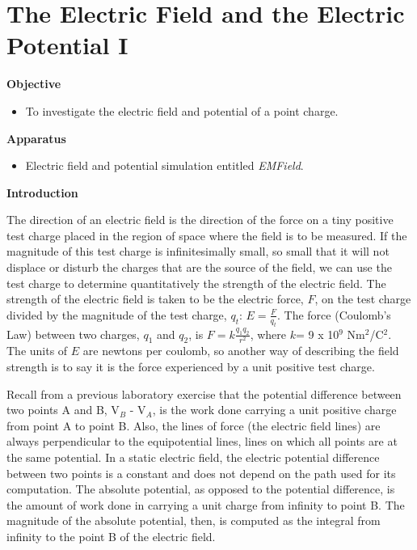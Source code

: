 
\section{The Electric Field and the Electric Potential I}

\makelabheader %

\textbf{Objective}

\begin{itemize}
\item To investigate the electric field and potential of a point charge.
\end{itemize}

\textbf{Apparatus}

\begin{itemize}
\item Electric field and potential simulation entitled {\it EMField}.
\end{itemize}

\textbf{Introduction}

The direction of an electric field is the direction of the force on
a tiny positive test charge placed in the region of space where the
field is to be measured. If the magnitude of this test charge is infinitesimally
small, so small that it will not displace or disturb the charges that
are the source of the field, we can use the test charge to determine
quantitatively the strength of the electric field. The strength of
the electric field is taken to be the electric force, $F$, on the test
charge divided by the magnitude of the test charge, \( q_{t} \):
\( E=\frac{F}{q_{t}} \). The force (Coulomb's Law) between two charges,
\( q_{1} \) and \( q_{2} \), is \( F=k\frac{q_{1}q_{2}}{r^{2}} \),
where \( k \)= 9 x 10\( ^{9} \) Nm\( ^{2} \)/C\( ^{2} \). The units
of \( E \) are newtons per coulomb, so another way of describing the field
strength is to say it is the force experienced by a unit positive
test charge.

Recall from a previous laboratory exercise that the potential difference
between two points A and B, V\( _{B} \) - V\( _{A} \), is the work
done carrying a unit positive charge from point A to point B. Also,
the lines of force (the electric field lines) are always perpendicular
to the equipotential lines, lines on which all points are at the same
potential. In a static electric field, the electric potential difference
between two points is a constant and does not depend on the path used
for its computation. The absolute potential, as opposed to the potential
difference, is the amount of work done in carrying a unit charge from
infinity to point B. The magnitude of the absolute potential, then,
is computed as the integral from infinity to the point B of the electric
field.

